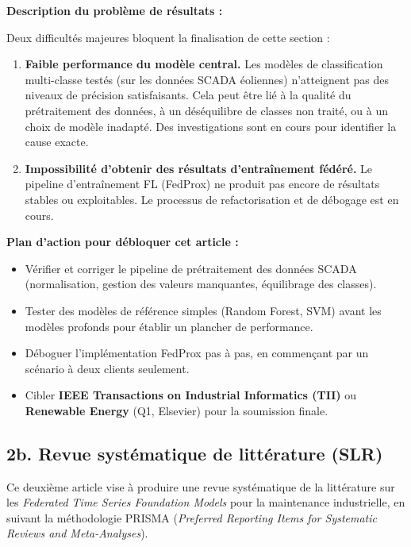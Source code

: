 \documentclass[12pt, a4paper]{report}
\begin{document}
\textbf{Description du problème de résultats :}

Deux difficultés majeures bloquent la finalisation de cette section :

\begin{enumerate}[leftmargin=*, label=\textbf{(\roman*)}]
  \item \textbf{Faible performance du modèle central.} Les modèles de classification
  multi-classe testés (sur les données SCADA éoliennes) n'atteignent pas des niveaux
  de précision satisfaisants. Cela peut être lié à la qualité du prétraitement des
  données, à un déséquilibre de classes non traité, ou à un choix de modèle inadapté.
  Des investigations sont en cours pour identifier la cause exacte.

  \item \textbf{Impossibilité d'obtenir des résultats d'entraînement fédéré.}
  Le pipeline d'entraînement FL (FedProx) ne produit pas encore de résultats
  stables ou exploitables. Le processus de refactorisation et de débogage est
  en cours.
\end{enumerate}

\begin{notebox}
\textbf{Plan d'action pour débloquer cet article :}
\begin{itemize}[noitemsep]
  \item Vérifier et corriger le pipeline de prétraitement des données SCADA
  (normalisation, gestion des valeurs manquantes, équilibrage des classes).
  \item Tester des modèles de référence simples (Random Forest, SVM) avant
  les modèles profonds pour établir un plancher de performance.
  \item Déboguer l'implémentation FedProx pas à pas, en commençant par un
  scénario à deux clients seulement.
  \item Cibler \textbf{IEEE Transactions on Industrial Informatics (TII)} ou
  \textbf{Renewable Energy} (Q1, Elsevier) pour la soumission finale.
\end{itemize}
\end{notebox}

\subsection*{2b. Revue systématique de littérature (SLR)}

Ce deuxième article vise à produire une revue systématique de la littérature sur
les \textit{Federated Time Series Foundation Models} pour la maintenance industrielle,
en suivant la méthodologie PRISMA (\textit{Preferred Reporting Items for Systematic
Reviews and Meta-Analyses}).
\end{document}
